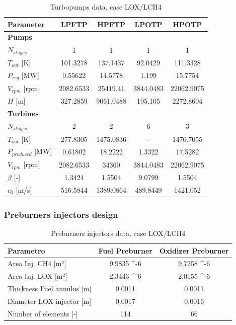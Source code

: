 \begin{table}[H]
\centering
\begin{tabular}{|l|c|c|c|c|}
\hline
\textbf{Parameter} & \textbf{LPFTP} & \textbf{HPFTP} & \textbf{LPOTP} & \textbf{HPOTP} \\ \hline
\textbf{Pumps} & & & & \\ \hline
$N_{stages}$ & 1 & 1 & 1 & 1 \\ \hline
$T_{out}$  [K] & 101.3278 & 137.1437 & 92.0429 & 111.3328 \\ \hline
$P_{req}$ [MW] & 0.55622 & 14.5778 & 1.199 & 15.7754 \\ \hline
$V_{rpm}$ [rpm] & 2082.6533 & 25419.41 & 3844.0483 & 22062.9075 \\ \hline
$H$ [m] & 327.2859 & 9061.0488 & 195.105 & 2272.8604 \\ \hline
\textbf{Turbines} & & & & \\ \hline
$N_{stages}$ & 2 & 2 & 6 & 3 \\ \hline
$T_{out}$  [K] & 277.8305 & 1475.0836 & - & 1476.7055 \\ \hline
$P_{produced}$ [MW] & 0.61802 & 18.2222 & 1.3322 & 17.5282 \\ \hline
$V_{rpm}$ [rpm] & 2082.6533 & 34360 & 3844.0483 & 22062.9075 \\ \hline
$\beta$ [-]& 1.3424 & 1.5504 & 9.0799 & 1.5504 \\ \hline
$c_{0}$  [m/s] & 516.5844 & 1389.0864 & 489.8449 & 1421.052 \\ \hline
\end{tabular}
\caption{Turbopumps data, case LOX/LCH4}
\label{tab:turbo_pump_ox_fuel}
\end{table}

\subsubsection{Preburners injectors design}

\begin{table}[H]
\centering
\begin{tabular}{|l|c|c|}
\hline
\textbf{Parametro} & \textbf{Fuel Preburner} & \textbf{Oxidizer Preburner} \\ \hline
Area Inj. CH4 [m²] & 9.9835 \times 10^{-6} & 9.7258 \times 10^{-6} \\ \hline
Area Inj. LOX [m²]& 2.3443 \times 10^{-6} & 2.0155 \times 10^{-6} \\ \hline
Thickness Fuel annulus [m] & 0.0011 & 0.0011 \\ \hline
Diameter LOX injector [m] & 0.0017 & 0.0016 \\ \hline
Number of elements  [-] & 114 & 66 \\ \hline
\end{tabular}
\caption{Preburners injectors data, case LOX/LCH4}
\label{tab:preburner_data}
\end{table}


